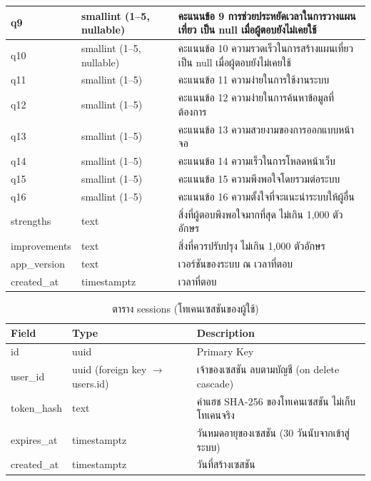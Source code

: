 \begin{longtable}{|p{3.6cm}|p{2.6cm}|p{6.8cm}|}
q9 & smallint (1--5, nullable) & คะแนนข้อ 9 การช่วยประหยัดเวลาในการวางแผนเที่ยว เป็น null เมื่อผู้ตอบยังไม่เคยใช้ \\ \hline
q10 & smallint (1--5, nullable) & คะแนนข้อ 10 ความรวดเร็วในการสร้างแผนเที่ยว เป็น null เมื่อผู้ตอบยังไม่เคยใช้ \\ \hline
q11 & smallint (1--5) & คะแนนข้อ 11 ความง่ายในการใช้งานระบบ \\ \hline
q12 & smallint (1--5) & คะแนนข้อ 12 ความง่ายในการค้นหาข้อมูลที่ต้องการ \\ \hline
q13 & smallint (1--5) & คะแนนข้อ 13 ความสวยงามของการออกแบบหน้าจอ \\ \hline
q14 & smallint (1--5) & คะแนนข้อ 14 ความเร็วในการโหลดหน้าเว็บ \\ \hline
q15 & smallint (1--5) & คะแนนข้อ 15 ความพึงพอใจโดยรวมต่อระบบ \\ \hline
q16 & smallint (1--5) & คะแนนข้อ 16 ความตั้งใจที่จะแนะนำระบบให้ผู้อื่น \\ \hline
strengths & text & สิ่งที่ผู้ตอบพึงพอใจมากที่สุด ไม่เกิน 1,000 ตัวอักษร \\ \hline
improvements & text & สิ่งที่ควรปรับปรุง ไม่เกิน 1,000 ตัวอักษร \\ \hline
app\_version & text & เวอร์ชันของระบบ ณ เวลาที่ตอบ \\ \hline
created\_at & timestamptz & เวลาที่ตอบ \\
\hline
\end{longtable}


\begin{table}[H]
\centering
\caption{ตาราง sessions (โทเคนเซสชันของผู้ใช้)}
\label{tab:db_sessions}
\begin{tabular}{|p{3.6cm}|p{2.6cm}|p{6.8cm}|}
\hline
\textbf{Field} & \textbf{Type} & \textbf{Description} \\
\hline
id & uuid & Primary Key \\ \hline
user\_id & uuid (foreign key $\to$ users.id) & เจ้าของเซสชัน ลบตามบัญชี (on delete cascade) \\ \hline
token\_hash & text & ค่าแฮช SHA-256 ของโทเคนเซสชัน ไม่เก็บโทเคนจริง \\ \hline
expires\_at & timestamptz & วันหมดอายุของเซสชัน (30 วันนับจากเข้าสู่ระบบ) \\ \hline
created\_at & timestamptz & วันที่สร้างเซสชัน \\
\hline
\end{tabular}
\end{table}

